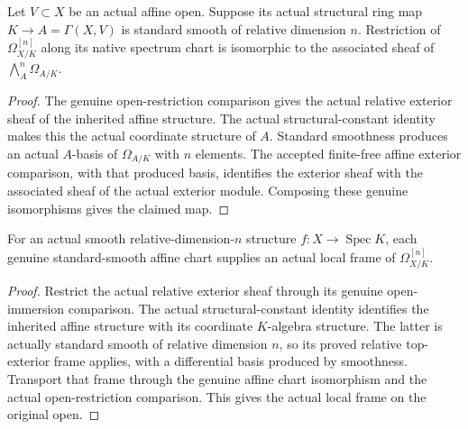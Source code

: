 \begin{theorem}
\label{sc0-canonical-port:can:actual-smooth-chart-exterior-coordinate-comparison}
\leanok
Let \(V\subset X\) be an actual affine open. Suppose its
actual structural ring map \(K\to A=\Gamma(X,V)\)
is standard smooth of relative dimension \(n\).
Restriction of \(\Omega^{[n]}_{X/K}\) along its native
spectrum chart is isomorphic to the associated sheaf of
\(\bigwedge^n_A\Omega_{A/K}\).
\end{theorem}
\begin{proof}
The genuine open-restriction comparison gives the actual
relative exterior sheaf of the inherited affine structure.
The actual structural-constant identity makes this the actual
coordinate structure of \(A\). Standard smoothness produces
an actual \(A\)-basis of \(\Omega_{A/K}\) with \(n\)
elements. The accepted finite-free affine exterior comparison,
with that produced basis, identifies the exterior sheaf with
the associated sheaf of the actual exterior module.
Composing these genuine isomorphisms gives the claimed map.
\end{proof}

\begin{theorem}
\label{sc0-canonical-port:can:actual-smooth-chart-relative-top-frame}
\leanok
For an actual smooth relative-dimension-\(n\) structure
\(f:X\to\operatorname{Spec}K\), each genuine standard-smooth affine
chart supplies an actual local frame of \(\Omega_{X/K}^{[n]}\).
\end{theorem}
\begin{proof}
Restrict the actual relative exterior sheaf through its genuine
open-immersion comparison. The actual structural-constant identity
identifies the inherited affine structure with its coordinate
\(K\)-algebra structure. The latter is actually standard smooth of
relative dimension \(n\), so its proved relative top-exterior frame
applies, with a differential basis produced by smoothness.
Transport that frame through the genuine affine chart isomorphism
and the actual open-restriction comparison. This gives the actual
local frame on the original open.
\end{proof}

